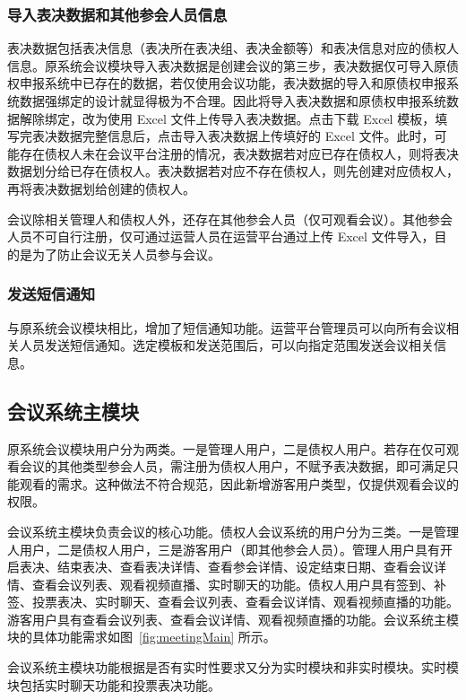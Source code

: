 \subsubsection{导入表决数据和其他参会人员信息}
表决数据包括表决信息（表决所在表决组、表决金额等）和表决信息对应的债权人信息。原系统会议模块导入表决数据是创建会议的第三步，表决数据仅可导入原债权申报系统中已存在的数据，若仅使用会议功能，表决数据的导入和原债权申报系统数据强绑定的设计就显得极为不合理。因此将导入表决数据和原债权申报系统数据解除绑定，改为使用 Excel 文件上传导入表决数据。点击下载 Excel 模板，填写完表决数据完整信息后，点击导入表决数据上传填好的 Excel 文件。此时，可能存在债权人未在会议平台注册的情况，表决数据若对应已存在债权人，则将表决数据划分给已存在债权人。表决数据若对应不存在债权人，则先创建对应债权人，再将表决数据划给创建的债权人。

会议除相关管理人和债权人外，还存在其他参会人员（仅可观看会议）。其他参会人员不可自行注册，仅可通过运营人员在运营平台通过上传 Excel 文件导入，目的是为了防止会议无关人员参与会议。

\subsubsection{发送短信通知}
与原系统会议模块相比，增加了短信通知功能。运营平台管理员可以向所有会议相关人员发送短信通知。选定模板和发送范围后，可以向指定范围发送会议相关信息。

\subsection{会议系统主模块}

原系统会议模块用户分为两类。一是管理人用户，二是债权人用户。若存在仅可观看会议的其他类型参会人员，需注册为债权人用户，不赋予表决数据，即可满足只能观看的需求。这种做法不符合规范，因此新增游客用户类型，仅提供观看会议的权限。

会议系统主模块负责会议的核心功能。债权人会议系统的用户分为三类。一是管理人用户，二是债权人用户，三是游客用户（即其他参会人员）。管理人用户具有开启表决、结束表决、查看表决详情、查看参会详情、设定结束日期、查看会议详情、查看会议列表、观看视频直播、实时聊天的功能。债权人用户具有签到、补签、投票表决、实时聊天、查看会议列表、查看会议详情、观看视频直播的功能。游客用户具有查看会议列表、查看会议详情、观看视频直播的功能。会议系统主模块的具体功能需求如图~\ref{fig:meetingMain} 所示。

会议系统主模块功能根据是否有实时性要求又分为实时模块和非实时模块。实时模块包括实时聊天功能和投票表决功能。

